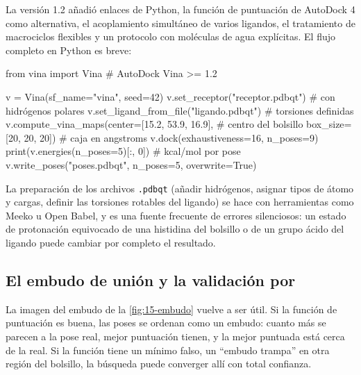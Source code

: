 \begin{simbolos}
\end{simbolos}

La versión 1.2 \parencite{c15-eberhardt2021} añadió enlaces de Python, la función de puntuación de AutoDock 4 como alternativa, el acoplamiento simultáneo de varios ligandos, el tratamiento de macrociclos flexibles y un protocolo con moléculas de agua explícitas. El flujo completo en Python es breve:

\begin{codigo}
from vina import Vina                           # AutoDock Vina >= 1.2

v = Vina(sf_name="vina", seed=42)
v.set_receptor("receptor.pdbqt")                # con hidrógenos polares
v.set_ligand_from_file("ligando.pdbqt")         # torsiones definidas
v.compute_vina_maps(center=[15.2, 53.9, 16.9],  # centro del bolsillo
                    box_size=[20, 20, 20])      # caja en angstroms
v.dock(exhaustiveness=16, n_poses=9)
print(v.energies(n_poses=5)[:, 0])              # kcal/mol por pose
v.write_poses("poses.pdbqt", n_poses=5, overwrite=True)
\end{codigo}

La preparación de los archivos \texttt{.pdbqt} (añadir hidrógenos, asignar tipos de átomo y cargas, definir las torsiones rotables del ligando) se hace con herramientas como Meeko u Open Babel, y es una fuente frecuente de errores silenciosos: un estado de protonación equivocado de una histidina del bolsillo o de un grupo ácido del ligando puede cambiar por completo el resultado.

\subsection{El embudo de unión y la validación por }

La imagen del embudo de la \cref{fig:15-embudo} vuelve a ser útil. Si la función de puntuación es buena, las poses se ordenan como un embudo: cuanto más se parecen a la pose real, mejor puntuación tienen, y la mejor puntuada está cerca de la real. Si la función tiene un mínimo falso, un ``embudo trampa'' en otra región del bolsillo, la búsqueda puede converger allí con total confianza.

